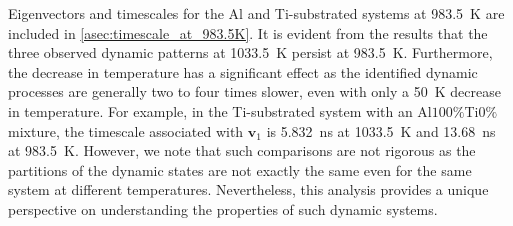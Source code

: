 Eigenvectors and timescales for the Al and Ti-substrated systems at \SI{983.5}{\kelvin} are included in \cref{asec:timescale_at_983.5K}. It is evident from the results that the three observed dynamic patterns at \SI{1033.5}{\kelvin} persist at \SI{983.5}{\kelvin}. Furthermore, the decrease in temperature has a significant effect as the identified dynamic processes are generally two to four times slower, even with only a \SI{50}{\kelvin} decrease in temperature. For example, in the Ti-substrated system with an Al$100\%$Ti$0\%$ mixture, the timescale associated with $\mathbf{v}_1$ is \SI{5.832}{\nano\second} at \SI{1033.5}{\kelvin} and \SI{13.68}{\nano\second} at \SI{983.5}{\kelvin}. However, we note that such comparisons are not rigorous as the partitions of the dynamic states are not exactly the same even for the same system at different temperatures. Nevertheless, this analysis provides a unique perspective on understanding the properties of such dynamic systems.

    

    

